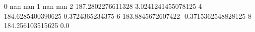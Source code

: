 0 nan nan
1 nan nan
2 187.2802276611328 3.0241241455078125
4 184.6285400390625 0.3724365234375
6 183.8845672607422 -0.3715362548828125
8 184.256103515625 0.0

